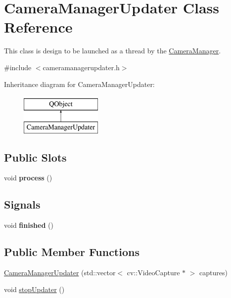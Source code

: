 \hypertarget{classCameraManagerUpdater}{}\section{Camera\+Manager\+Updater Class Reference}
\label{classCameraManagerUpdater}


This class is design to be launched as a thread by the \hyperlink{classCameraManager}{Camera\+Manager}.  




{\ttfamily \#include $<$cameramanagerupdater.\+h$>$}

Inheritance diagram for Camera\+Manager\+Updater\+:\begin{figure}[H]
\begin{center}
\leavevmode
\includegraphics[height=2.000000cm]{classCameraManagerUpdater}
\end{center}
\end{figure}
\subsection*{Public Slots}
\begin{DoxyCompactItemize}
\item 
\hypertarget{classCameraManagerUpdater_a0e903705a4c146be3da91ee3fe36e8d7}{}void {\bfseries process} ()\label{classCameraManagerUpdater_a0e903705a4c146be3da91ee3fe36e8d7}

\end{DoxyCompactItemize}
\subsection*{Signals}
\begin{DoxyCompactItemize}
\item 
\hypertarget{classCameraManagerUpdater_a0c355ff645f36efea192bf1dbec9dcb9}{}void {\bfseries finished} ()\label{classCameraManagerUpdater_a0c355ff645f36efea192bf1dbec9dcb9}

\end{DoxyCompactItemize}
\subsection*{Public Member Functions}
\begin{DoxyCompactItemize}
\item 
\hyperlink{classCameraManagerUpdater_a7419c3a34834f5e49bd4bf0df5e33f13}{Camera\+Manager\+Updater} (std\+::vector$<$ cv\+::\+Video\+Capture $\ast$ $>$ captures)
\item 
void \hyperlink{classCameraManagerUpdater_a05242c144594eb1591d3bbb24ab61f56}{stop\+Updater} ()
\end{DoxyCompactItemize}


